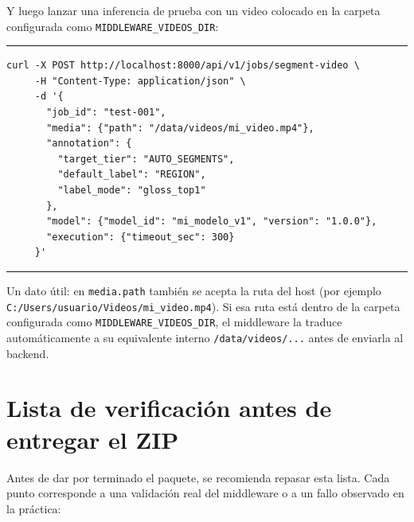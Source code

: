 \documentclass[12pt,a4paper]{article}
\begin{document}
Y luego lanzar una inferencia de prueba con un video colocado en la carpeta configurada como \texttt{MIDDLEWARE\_VIDEOS\_DIR}:

\begin{center}
\begin{minipage}{0.92\textwidth}
\hrule
\vspace{0.06cm}
\footnotesize
\begin{Verbatim}[baselinestretch=0.8]
curl -X POST http://localhost:8000/api/v1/jobs/segment-video \
     -H "Content-Type: application/json" \
     -d '{
       "job_id": "test-001",
       "media": {"path": "/data/videos/mi_video.mp4"},
       "annotation": {
         "target_tier": "AUTO_SEGMENTS",
         "default_label": "REGION",
         "label_mode": "gloss_top1"
       },
       "model": {"model_id": "mi_modelo_v1", "version": "1.0.0"},
       "execution": {"timeout_sec": 300}
     }'
\end{Verbatim}
\vspace{0.03cm}
\hrule
{}
\end{minipage}
\end{center}

Un dato útil: en \texttt{media.path} también se acepta la ruta del host (por ejemplo \texttt{C:/Users/usuario/Videos/mi\_video.mp4}). Si esa ruta está dentro de la carpeta configurada como \texttt{MIDDLEWARE\_VIDEOS\_DIR}, el middleware la traduce automáticamente a su equivalente interno \texttt{/data/videos/...} antes de enviarla al backend.

\section{Lista de verificación antes de entregar el ZIP}

Antes de dar por terminado el paquete, se recomienda repasar esta lista. Cada punto corresponde a una validación real del middleware o a un fallo observado en la práctica:
\end{document}
